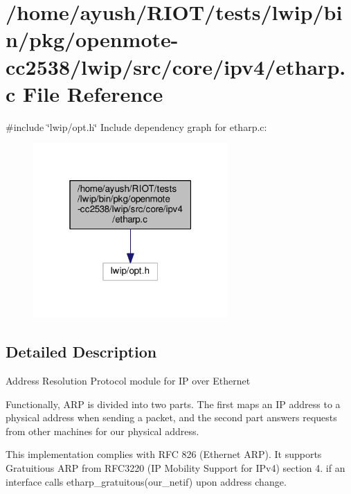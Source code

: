 \hypertarget{openmote-cc2538_2lwip_2src_2core_2ipv4_2etharp_8c}{}\section{/home/ayush/\+R\+I\+O\+T/tests/lwip/bin/pkg/openmote-\/cc2538/lwip/src/core/ipv4/etharp.c File Reference}
\label{openmote-cc2538_2lwip_2src_2core_2ipv4_2etharp_8c}
{\ttfamily \#include \char`\"{}lwip/opt.\+h\char`\"{}}\newline
Include dependency graph for etharp.\+c\+:
\nopagebreak
\begin{figure}[H]
\begin{center}
\leavevmode
\includegraphics[width=211pt]{openmote-cc2538_2lwip_2src_2core_2ipv4_2etharp_8c__incl}
\end{center}
\end{figure}


\subsection{Detailed Description}
Address Resolution Protocol module for IP over Ethernet

Functionally, A\+RP is divided into two parts. The first maps an IP address to a physical address when sending a packet, and the second part answers requests from other machines for our physical address.

This implementation complies with R\+FC 826 (Ethernet A\+RP). It supports Gratuitious A\+RP from R\+F\+C3220 (IP Mobility Support for I\+Pv4) section 4. if an interface calls etharp\+\_\+gratuitous(our\+\_\+netif) upon address change. 